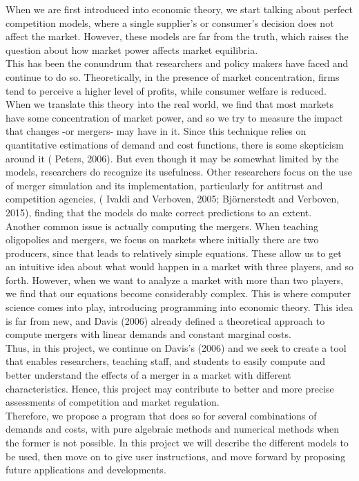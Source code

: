 \documentclass[12pt]{article}
\begin{document}
When we are first introduced into economic theory, we start talking about perfect competition models, where a single supplier's or consumer's decision does not affect the market. However, these models are far from the truth, which raises the question about how market power affects market equilibria.\\
This has been the conundrum that researchers and policy makers have faced and continue to do so. Theoretically, in the presence of market concentration, firms tend to perceive a higher level of profits, while consumer welfare is reduced. When we translate this theory into the real world, we find that most markets have some concentration of market power, and so we try to measure the impact that changes -or mergers- may have in it. Since this technique relies on quantitative estimations of demand and cost functions, there is some skepticism around it (\cite{peters} Peters, 2006). But even though it may be somewhat limited by the models, researchers do recognize its usefulness. Other researchers focus on the use of merger simulation and its implementation, particularly for antitrust and competition agencies, (\cite{ivaldi} \cite{bjorn} Ivaldi and Verboven, 2005; Bj\"{o}rnerstedt and Verboven, 2015), finding that the models do make correct predictions to an extent. \\
Another common issue is actually computing the mergers. When teaching oligopolies and mergers, we focus on markets where initially there are two producers, since that leads to relatively simple equations. These allow us to get an intuitive idea about what would happen in a market with three players, and so forth. However, when we want to analyze a market with more than two players, we find that our equations become considerably complex. This is where computer science comes into play, introducing programming into economic theory. This idea is far from new, and Davis (2006) \cite{davis} already defined a theoretical approach to compute mergers with linear demands and constant marginal costs.\\
Thus, in this project, we continue on Davis's (2006) \cite{davis} and we seek to create a tool that enables researchers, teaching staff, and students to easily compute and better understand the effects of a merger in a market with different characteristics. Hence, this project may contribute to better and more precise assessments of competition and market regulation.\\
Therefore, we propose a program that does so for several combinations of demands and costs, with pure algebraic methods and numerical methods when the former is not possible. In this project we will describe the different models to be used, then move on to give user instructions, and move forward by proposing future applications and developments. 
\end{document}
